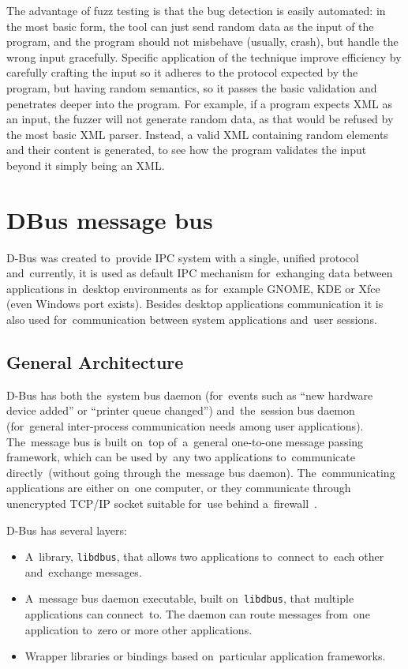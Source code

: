 \documentclass[conference]{IEEEtran}
\begin{document}
The advantage of fuzz testing is that the bug detection is easily automated: in
the most basic form, the tool can just send random data as the input of the
program, and the program should not misbehave (usually, crash), but handle the
wrong input gracefully. Specific application of the technique improve efficiency by
carefully crafting the input so it adheres to the protocol expected by the
program, but having random semantics, so it passes the basic validation and
penetrates deeper into the program. For example, if a program expects XML as an
input, the fuzzer will not generate random data, as that would be refused by
the most basic XML parser. Instead, a valid XML containing random elements and
their content is generated, to see how the program validates the input beyond
it simply being an XML.

\section{DBus message bus}
D-Bus was created to~provide IPC system with a single, unified protocol
and~currently, it is used as default IPC mechanism for~exhanging data between
applications in~desktop environments as for~example GNOME, KDE or Xfce (even
Windows port exists). Besides desktop applications communication it is also used
for~communication between system applications and~user sessions.

\subsection{General Architecture}

D-Bus has both the~system bus daemon (for~events such as ``new hardware device
added'' or ``printer queue changed'') and~the~session bus daemon (for~general
inter-process communication needs among user \mbox{applications}). The~message bus
is built on~top of~a~general one-to-one message passing framework, which can be
used by~any two applications to~communicate directly~(without going through
the~message bus daemon). The~communicating applications are either on~one computer,
or they communicate through unencrypted TCP/IP socket suitable for~use behind
a~firewall~\cite{DBUS}.

D-Bus has several layers:
\begin{itemize}
	\item A~library, \texttt{libdbus}, that allows two applications to~connect
		to~each other and~exchange messages.
	\item A~message bus daemon executable, built on~\texttt{libdbus},
		that multiple applications can connect~to. The daemon can route messages
		from~one application to~zero or more other applications.
	\item Wrapper libraries or bindings based on~particular application frameworks.
\end{itemize}
\end{document}
